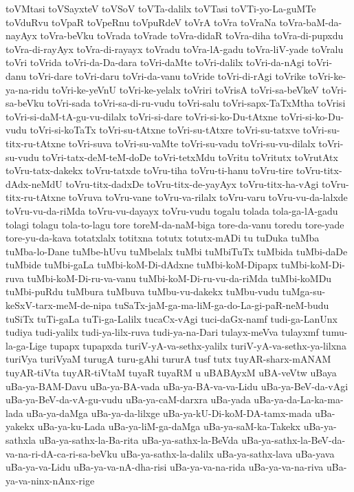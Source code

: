 {toVMtasi
toVSayxteV
toVSoV
toVTa-dalilx
toVTasi
toVTi-yo-La-guMTe
toVduRvu
toVpaR
toVpeRnu
toVpuRdeV
toVrA
toVra
toVraNa
toVra-baM-da-nayAyx
toVra-beVku
toVrada
toVrade
toVra-didaR
toVra-diha
toVra-di-pupxdu
toVra-di-rayAyx
toVra-di-rayayx
toVradu
toVra-lA-gadu
toVra-liV-yade
toVralu
toVri
toVrida
toVri-da-Da-dara
toVri-daMte
toVri-dalilx
toVri-da-nAgi
toVri-danu
toVri-dare
toVri-daru
toVri-da-vanu
toVride
toVri-di-rAgi
toVrike
toVri-ke-ya-na-ridu
toVri-ke-yeVnU
toVri-ke-yelalx
toVriri
toVrisA
toVri-sa-beVkeV
toVri-sa-beVku
toVri-sada
toVri-sa-di-ru-vudu
toVri-salu
toVri-sapx-TaTxMtha
toVrisi
toVri-si-daM-tA-gu-vu-dilalx
toVri-si-dare
toVri-si-ko-Du-tAtxne
toVri-si-ko-Du-vudu
toVri-si-koTaTx
toVri-su-tAtxne
toVri-su-tAtxre
toVri-su-tatxve
toVri-su-titx-ru-tAtxne
toVri-suva
toVri-su-vaMte
toVri-su-vadu
toVri-su-vu-dilalx
toVri-su-vudu
toVri-tatx-deM-teM-doDe
toVri-tetxMdu
toVritu
toVritutx
toVrutAtx
toVru-tatx-dakekx
toVru-tatxde
toVru-tiha
toVru-ti-hanu
toVru-tire
toVru-titx-dAdx-neMdU
toVru-titx-dadxDe
toVru-titx-de-yayAyx
toVru-titx-ha-vAgi
toVru-titx-ru-tAtxne
toVruva
toVru-vane
toVru-va-rilalx
toVru-varu
toVru-vu-da-lalxde
toVru-vu-da-riMda
toVru-vu-dayayx
toVru-vudu
togalu
tolada
tola-ga-lA-gadu
tolagi
tolagu
tola-to-lagu
tore
toreM-da-naM-biga
tore-da-vanu
toredu
tore-yade
tore-yu-da-kava
totatxlalx
totitxna
totutx
totutx-mADi
tu
tuDuka
tuMba
tuMba-lo-Dane
tuMbe-hUvu
tuMbelalx
tuMbi
tuMbiTuTx
tuMbida
tuMbi-daDe
tuMbide
tuMbi-gaLa
tuMbi-koM-Di-dAdxne
tuMbi-koM-Dipapx
tuMbi-koM-Di-ruva
tuMbi-koM-Di-ru-va-vanu
tuMbi-koM-Di-ru-vu-da-riMda
tuMbi-koMDu
tuMbi-puRdu
tuMbura
tuMbuva
tuMbu-vu-dakekx
tuMbu-vudu
tuMga-su-keSxV-tarx-meM-de-nipa
tuSaTx-jaM-ga-ma-liM-ga-do-La-gi-paR-neM-budu
tuSiTx
tuTi-gaLa
tuTi-ga-Lalilx
tucaCx-vAgi
tuci-daGx-namf
tudi-ga-LanUnx
tudiya
tudi-yalilx
tudi-ya-lilx-ruva
tudi-ya-na-Dari
tulayx-meVva
tulayxmf
tumu-la-ga-Lige
tupapx
tupapxda
turiV-yA-va-sethx-yalilx
turiV-yA-va-sethx-ya-lilxna
turiVya
turiVyaM
turugA
turu-gAhi
tururA
tusf
tutx
tuyAR-sharx-mANAM
tuyAR-tiVta
tuyAR-tiVtaM
tuyaR
tuyaRM
u
uBABAyxM
uBA-veVtw
uBaya
uBa-ya-BAM-Davu
uBa-ya-BA-vada
uBa-ya-BA-va-va-Lidu
uBa-ya-BeV-da-vAgi
uBa-ya-BeV-da-vA-gu-vudu
uBa-ya-caM-darxra
uBa-yada
uBa-ya-da-La-ka-ma-lada
uBa-ya-daMga
uBa-ya-da-lilxge
uBa-ya-kU-Di-koM-DA-tamx-mada
uBa-yakekx
uBa-ya-ku-Lada
uBa-ya-liM-ga-daMga
uBa-ya-saM-ka-Takekx
uBa-ya-sathxla
uBa-ya-sathx-la-Ba-rita
uBa-ya-sathx-la-BeVda
uBa-ya-sathx-la-BeV-da-va-na-ri-dA-ca-ri-sa-beVku
uBa-ya-sathx-la-dalilx
uBa-ya-sathx-lava
uBa-yava
uBa-ya-va-Lidu
uBa-ya-va-nA-dha-risi
uBa-ya-va-na-rida
uBa-ya-va-na-riva
uBa-ya-va-ninx-nAnx-rige
}
